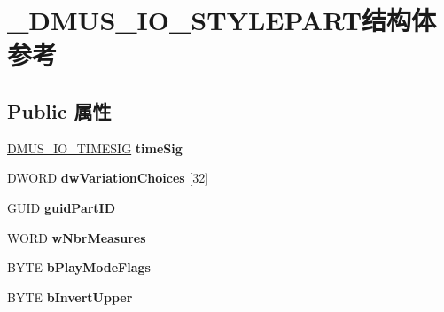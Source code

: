 \hypertarget{struct___d_m_u_s___i_o___s_t_y_l_e_p_a_r_t}{}\section{\+\_\+\+D\+M\+U\+S\+\_\+\+I\+O\+\_\+\+S\+T\+Y\+L\+E\+P\+A\+R\+T结构体 参考}
\label{struct___d_m_u_s___i_o___s_t_y_l_e_p_a_r_t}
\subsection*{Public 属性}
\begin{DoxyCompactItemize}
\item 
\mbox{\label{struct___d_m_u_s___i_o___s_t_y_l_e_p_a_r_t_a6b49412a273a8836f897074304511cad}} 
\hyperlink{struct___d_m_u_s___i_o___t_i_m_e_s_i_g}{D\+M\+U\+S\+\_\+\+I\+O\+\_\+\+T\+I\+M\+E\+S\+IG} {\bfseries time\+Sig}
\item 
\mbox{\label{struct___d_m_u_s___i_o___s_t_y_l_e_p_a_r_t_a39d1a4a33508d24570cb5f9096209d0a}} 
D\+W\+O\+RD {\bfseries dw\+Variation\+Choices} \mbox{[}32\mbox{]}
\item 
\mbox{\label{struct___d_m_u_s___i_o___s_t_y_l_e_p_a_r_t_ab4fe46064457e054277a58e0fec97f93}} 
\hyperlink{interface_g_u_i_d}{G\+U\+ID} {\bfseries guid\+Part\+ID}
\item 
\mbox{\label{struct___d_m_u_s___i_o___s_t_y_l_e_p_a_r_t_a341b172932283a49bd6942bf0d0ee9d5}} 
W\+O\+RD {\bfseries w\+Nbr\+Measures}
\item 
\mbox{\label{struct___d_m_u_s___i_o___s_t_y_l_e_p_a_r_t_a5268a4d929a70a01525964354f01e3a9}} 
B\+Y\+TE {\bfseries b\+Play\+Mode\+Flags}
\item 
\mbox{\label{struct___d_m_u_s___i_o___s_t_y_l_e_p_a_r_t_abd1ea8202fe364fc3948eff71ef796d3}} 
B\+Y\+TE {\bfseries b\+Invert\+Upper}
\item 
\mbox{\label{struct___d_m_u_s___i_o___s_t_y_l_e_p_a_r_t_a0f14e0ac654a7abe531cb5a2b59cf0ab}} 

\end{DoxyCompactItemize}
